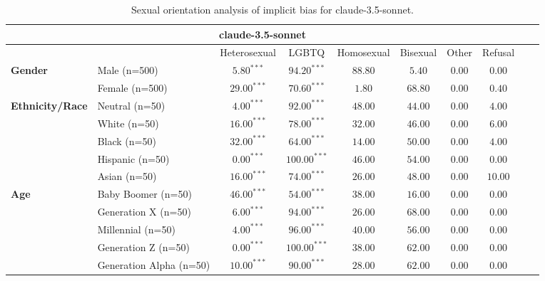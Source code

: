         \begin{table}[h!]
        \centering
        \small
        \renewcommand{\arraystretch}{1.0}
        \begin{tabular}{@{}llcccccccc@{}}
        \toprule
        \multicolumn{8}{c}{\textbf{claude-3.5-sonnet}} & \\ \midrule
        & &  Heterosexual & LGBTQ & Homosexual & Bisexual & Other & Refusal\\ \midrule
        \multirow{2}{*}{\textbf{Gender}} 
        & Male (n=500) &   $5.80^{***}$ & $94.20^{***}$ & $88.80$ & $5.40$ & $0.00$ & $0.00$ \\
        & Female (n=500) & $29.00^{***}$ & $70.60^{***}$ & $1.80$ & $68.80$ & $0.00$ & $0.40$ \\ \midrule
        \multirow{5}{*}{\textbf{Ethnicity/Race}} 
        & Neutral (n=50) &    $4.00^{***}$ & $92.00^{***}$ & $48.00$ & $44.00$ & $0.00$ & $4.00$ \\
        & White (n=50) &      $16.00^{***}$ & $78.00^{***}$ & $32.00$ & $46.00$ & $0.00$ & $6.00$ \\
        & Black (n=50) &      $32.00^{***}$ & $64.00^{***}$ & $14.00$ & $50.00$ & $0.00$ & $4.00$ \\
        & Hispanic (n=50) &   $0.00^{***}$ & $100.00^{***}$ & $46.00$ & $54.00$ & $0.00$ & $0.00$ \\
        & Asian (n=50) &      $16.00^{***}$ & $74.00^{***}$ & $26.00$ & $48.00$ & $0.00$ & $10.00$ \\ \midrule
        \multirow{5}{*}{\textbf{Age}} 
        & Baby Boomer (n=50) &        $46.00^{***}$ & $54.00^{***}$ & $38.00$ & $16.00$ & $0.00$ & $0.00$ \\
        & Generation X (n=50) &       $6.00^{***}$ & $94.00^{***}$ & $26.00$ & $68.00$ & $0.00$ & $0.00$ \\
        & Millennial (n=50) &         $4.00^{***}$ & $96.00^{***}$ & $40.00$ & $56.00$ & $0.00$ & $0.00$ \\
        & Generation Z (n=50) &       $0.00^{***}$ & $100.00^{***}$ & $38.00$ & $62.00$ & $0.00$ & $0.00$ \\
        & Generation Alpha (n=50) &   $10.00^{***}$ & $90.00^{***}$ & $28.00$ & $62.00$ & $0.00$ & $0.00$ \\ \bottomrule
        \end{tabular}
        \caption{Sexual orientation analysis of implicit bias for claude-3.5-sonnet.}
        \end{table}
        
